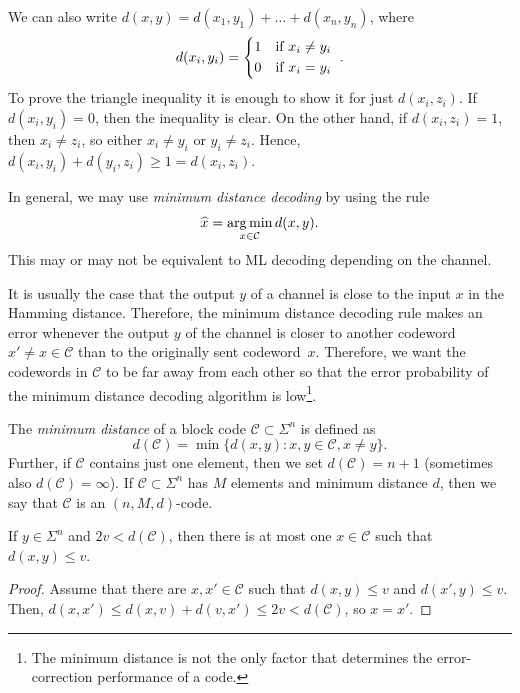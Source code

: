 \documentclass[../main.tex]{subfiles}
\begin{document}
We can also write $d(x, y) = d(x_1, y_1) + \dots + d(x_n, y_n)$, where
\begin{equation*}
    d(x_i, y_i) = \begin{dcases*}
        1 & if $x_i \neq y_i$ \\
        0 & if $x_i = y_i$
    \end{dcases*}.
\end{equation*}
To prove the triangle inequality it is enough to show it for just $d(x_i, z_i)$. If $d(x_i, y_i) = 0$, then the inequality is clear. On the other hand, if $d(x_i, z_i) = 1$, then $x_i \neq z_i$, so either $x_i \neq y_i$ or $y_i \neq z_i$. Hence, $d(x_i, y_i) + d(y_i, z_i) \geq 1 = d(x_i, z_i)$.

In general, we may use \emph{minimum distance decoding} by using the rule
\begin{equation*}
    \widehat{x} = \operatorname*{arg\,min}_{x \in \mathcal{C}} d(x, y).
\end{equation*}
This may or may not be equivalent to ML decoding depending on the channel.

It is usually the case that the output $y$ of a channel is close to the input $x$ in the Hamming distance. Therefore, the minimum distance decoding rule makes an error whenever the output $y$ of the channel is closer to another codeword $x' \neq x \in \mathcal{C}$ than to the originally sent codeword~$x$. Therefore, we want the codewords in $\mathcal{C}$ to be far away from each other so that the error probability of the minimum distance decoding algorithm is low\footnote{The minimum distance is not the only factor that determines the error-correction performance of a code.}.

The \emph{minimum distance} of a block code $\mathcal{C} \subset \Sigma^n$ is defined as
\begin{equation*}
    d(\mathcal{C}) = \min \{d(x, y) \colon x, y \in \mathcal{C}, x \neq y\}.
\end{equation*}
Further, if $\mathcal{C}$ contains just one element, then we set $d(\mathcal{C}) = n + 1$ (sometimes also $d(\mathcal{C}) = \infty$). If $\mathcal{C} \subset \Sigma^n$ has $M$ elements and minimum distance $d$, then we say that $\mathcal{C}$ is an $(n, M, d)$-code.

\begin{lemma}
If $y \in \Sigma^n$ and $2v < d(\mathcal{C})$, then there is at most one $x \in \mathcal{C}$ such that $d(x, y) \leq v$.
\end{lemma}

\begin{proof}
Assume that there are $x, x' \in \mathcal{C}$ such that $d(x, y) \leq v$ and $d(x', y) \leq v$. Then, $d(x, x') \leq d(x, v) + d(v, x') \leq 2v < d(\mathcal{C})$, so $x = x'$.
\end{proof}
\end{document}

